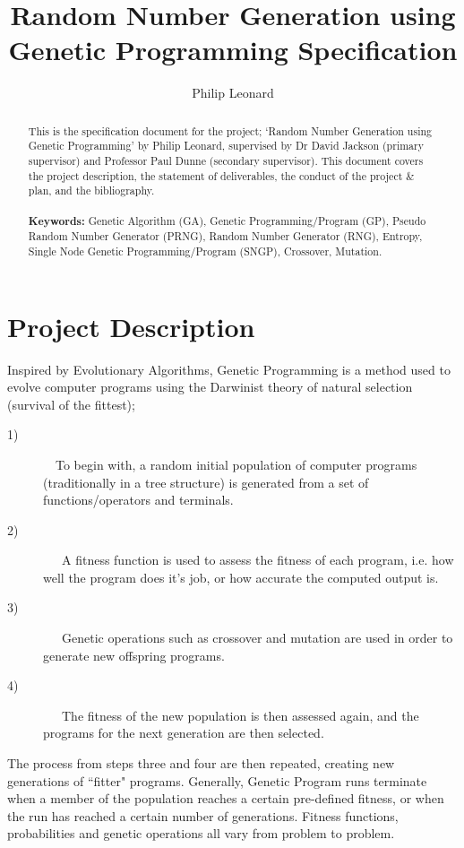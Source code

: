 \documentclass[a4paper,10.5pt]{article}
\title{Random Number Generation using Genetic Programming Specification}
\author{Philip Leonard}
\date{}
\begin{document}
\maketitle
\begin{abstract}
This is the specification document for the project; `Random Number Generation using Genetic Programming' by Philip Leonard, supervised by Dr David Jackson (primary supervisor) and Professor Paul Dunne (secondary supervisor). This document covers the project description, the statement of deliverables, the conduct of the project \& plan, and the bibliography.\\\\
\textbf{Keywords:} Genetic Algorithm (GA), Genetic Programming/Program (GP), Pseudo Random Number Generator (PRNG), Random Number Generator (RNG), Entropy, Single Node Genetic Programming/Program (SNGP), Crossover, Mutation.
\end{abstract}
\section{Project Description}
Inspired by Evolutionary Algorithms, Genetic Programming is a method used to evolve computer programs using the Darwinist theory of natural selection (survival of the fittest);
\begin{description}
  \item[1)]
  \ \ To begin with, a random initial population of computer programs (traditionally in a tree structure) is generated from a set of functions/operators and terminals. 
  \item[2)]
 \ \ \ A fitness function is used to assess the fitness of each program, i.e. how well the program does it's job, or how accurate the computed output is. 
  \item[3)]
  \ \ \ Genetic operations such as crossover and mutation are used in order to generate new offspring programs.
  \item[4)]
 \ \ \ The fitness of the new population is then assessed again, and the programs for the next generation are then selected.
\end{description}

The process from steps three and four are then repeated, creating new generations of ``fitter" programs. Generally, Genetic Program runs terminate when a member of the population reaches a certain pre-defined fitness, or when the run has reached a certain number of generations. Fitness functions, probabilities and genetic operations all vary from problem to problem.\\
\end{document}
